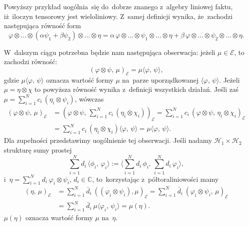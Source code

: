 \documentclass[a4paper,11pt]{article}
\newcommand{\ld}{\ldots}
\newcommand{\mb}{\mathbb}
\newcommand{\mc}{\mathcal}
\newcommand{\al}{\alpha}
\newcommand{\vp}{\varphi}
\newcommand{\C}{\mb{C}}
\newcommand{\Hc}{\mc{H}}
\newcommand{\ti}{\times}
\newcommand{\ot}{\otimes}
\newcommand{\Sum}{\sum\limits}
\newcommand{\lket}{\langle}
\newcommand{\rket}{\rangle}
\newcommand{\SP}[2]{( #1, \, #2 )} %
\newcommand{\dket}[2]{\lket #1, \, #2 \rket} %
\begin{document}
Powyższy przykład uogólnia~się do~dobrze znanego z~algebry liniowej
faktu, iż~iloczyn tensorowy jest wieloliniowy. Z~samej definicji
wynika, że~zachodzi następująca równość form
\begin{equation*}
  \vp \ot \ld \ot ( \al \psi_{ 1 } + \beta \psi_{ 2 } ) \ot \ld \ot \eta
  = \al \, \vp \ot \ld \ot \psi_{ 1 } \ot \ld \ot \eta
  + \beta \, \vp \ot \ld \ot \psi_{ 2 } \ot \ld \ot \eta.
\end{equation*}

W~dalszym ciągu potrzebna będzie nam następująca obserwacja: jeżeli
$\mu \in \mc{E}$, to zachodzi równość:
\begin{equation*}
  \SP{ \vp \ot \psi }{ \mu }_{ \mc{E} } = \mu\dket{ \vp }{ \psi },
\end{equation*}
gdzie $\mu\dket{ \vp }{ \psi }$ oznacza wartość formy $\mu$ na~parze
uporządkowanej $\dket{ \vp }{ \psi }$. Jeżeli $\mu = \eta \ot \chi$ to
powyższa równość wynika z~definicji wszystkich działań. Jeśli zaś
$\mu = \Sum_{ i = 1 }^{ N } c_{ i } \, ( \eta_{ i } \ot \psi_{ i } )$,
wówczas
\begin{equation*}
  \begin{split}
    \SP{ \vp \ot \psi }{ \mu }_{ \mc{E} } &= \left( \vp \ot \psi, \,
      \Sum_{ i = 1 }^{ N } c_{ i } \, ( \eta_{ i } \ot \chi_{ i } )
    \right)_{ \mc{E} } = \Sum_{ i = 1 }^{ N } c_{ i } \, \SP{ \vp \ot
      \psi }
    { \eta_{ i } \ot \chi_{ i } }_{ \mc{E} } \\
    &= \Sum_{ i = 1 }^{ N } c_{ i } \, ( \eta_{ i } \ot \chi_{ i } )
    \dket{ \vp }{ \psi } = \mu\dket{ \vp }{ \psi }.
  \end{split}
\end{equation*}
Dla zupełności przedstawimy uogólnienie tej obserwacji. Jeśli nadamy
$\Hc_{ 1 } \ti \Hc_{ 2 }$ strukturę sumy prostej
\begin{equation}
  \label{eq:4}
  \Sum_{ i = 1 }^{ N } d_{ i } \, \dket{ \phi_{ i } }{ \vp_{ i } }
  := \lket \Sum_{ i = 1 }^{ N } d_{ i } \, \phi_{ i }, \,
  \Sum_{ i = 1 }^{ N } d_{ i } \, \vp_{ i } \rket,
\end{equation}
i~$\eta = \Sum_{ i = 1 }^{ N } d_{ i } \: \vp_{ i } \ot \psi_{ i }$,
$d_{ i } \in \C$, to~korzystając z~półtoraliniowości mamy
\begin{equation*}
  \begin{split}
    ( \eta, \, \mu )_{ \mc{E} } &= \Sum_{ i = 1 }^{ N } \bar{ d }_{ i
    } \: ( ( \vp_{ i } \ot \psi_{ i } ), \mu )_{ \mc{E} } = \Sum_{ i =
      1 }^{ N } \bar{ d }_{ i } \:
    \SP{ \vp_{ i } \ot \psi_{ i } }{ \mu }_{ \mc{E} } \\
    &= \Sum_{ i = 1 }^{ N } \bar{ d }_{ i } \: \mu \lket \vp_{ i }, \,
    \psi_{ i } \rket = \mu( \eta ).
  \end{split}
\end{equation*}
$\mu( \eta )$ oznacza wartość formy $\mu$ na~$\eta$.
\end{document}
